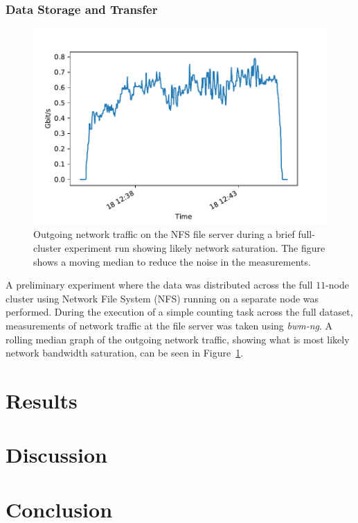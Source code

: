 \documentclass{article}
\begin{document}
\begin{multicols}{2}
\subsubsection*{Data Storage and Transfer}

\begin{figure}[H]
  \includegraphics[width=\linewidth]{rolling}
  \caption{Outgoing network traffic on the NFS file server during a
    brief full-cluster experiment run showing likely network
    saturation. The figure shows a moving median to reduce the noise in
    the measurements.}\label{fig:rolling-data}
\end{figure}


A preliminary experiment where the data was distributed across the full
$11$-node cluster using Network File System (NFS) running on a separate
node was performed. During the execution of a simple counting task
across the full dataset, measurements of network traffic at the file
server was taken using \textit{bwm-ng}. A rolling median graph of the
outgoing network traffic, showing what is most likely network bandwidth
saturation, can be seen in Figure~\ref{fig:rolling-data}.

\section*{ Results}

\section*{ Discussion}
\cite{kelley2012guess} \cite{weir2009password}

\section*{ Conclusion}


\end{multicols}
\end{document}

